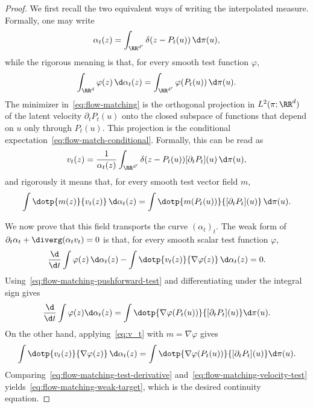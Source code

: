\begin{proof}
	We first recall the two equivalent ways of writing the interpolated measure. Formally, one may write
	\[
		\alpha_t(z)=\int_{\RR^{d'}}\delta(z-P_t(u))\,\d\pi(u),
	\]
	while the rigorous meaning is that, for every smooth test function $\varphi$,
	\begin{equation}\label{eq:flow-matching-pushforward-test}
		\int_{\RR^d}\varphi(z)\,\d\alpha_t(z)
		=
		\int_{\RR^{d'}}\varphi(P_t(u))\,\d\pi(u).
	\end{equation}
	The minimizer in~\eqref{eq:flow-matching} is the orthogonal projection in $L^2(\pi;\RR^d)$ of the latent velocity $\partial_tP_t(u)$ onto the closed subspace of functions that depend on $u$ only through $P_t(u)$. This projection is the conditional expectation~\eqref{eq:flow-match-conditional}. Formally, this can be read as
	\[
		v_t(z)=\frac{1}{\alpha_t(z)}
		\int_{\RR^{d'}}\delta(z-P_t(u))[\partial_tP_t](u)\,\d\pi(u),
	\]
	and rigorously it means that, for every smooth test vector field $m$,
	\begin{equation}\label{eq:v_t}
		\int \dotp{m(z)}{v_t(z)} \, \d\alpha_t(z)
		=
		\int \dotp{m(P_t(u))}{[\partial_t P_t](u)} \, \d\pi(u).
	\end{equation}

	We now prove that this field transports the curve $(\alpha_t)_t$. The weak form of
	$\partial_t\alpha_t+\diverg(\alpha_t v_t)=0$ is that, for every smooth scalar test function $\varphi$,
	\begin{equation}\label{eq:flow-matching-weak-target}
		\frac{\d}{\d t}\int\varphi(z)\,\d\alpha_t(z)
		-
		\int\dotp{v_t(z)}{\nabla\varphi(z)}\,\d\alpha_t(z)
		=0.
	\end{equation}
	Using~\eqref{eq:flow-matching-pushforward-test} and differentiating under the integral sign gives
	\begin{equation}\label{eq:flow-matching-test-derivative}
		\frac{\d}{\d t}\int \varphi(z)\d\alpha_t(z)
		=
		\int \dotp{\nabla\varphi(P_t(u))}{[\partial_t P_t](u)}\d\pi(u).
	\end{equation}
	On the other hand, applying~\eqref{eq:v_t} with $m=\nabla\varphi$ gives
	\begin{equation}\label{eq:flow-matching-velocity-test}
		\int\dotp{v_t(z)}{\nabla\varphi(z)}\,\d\alpha_t(z)
		=
		\int \dotp{\nabla\varphi(P_t(u))}{[\partial_t P_t](u)}\d\pi(u).
	\end{equation}
	Comparing~\eqref{eq:flow-matching-test-derivative} and~\eqref{eq:flow-matching-velocity-test} yields~\eqref{eq:flow-matching-weak-target}, which is the desired continuity equation.
\end{proof}

